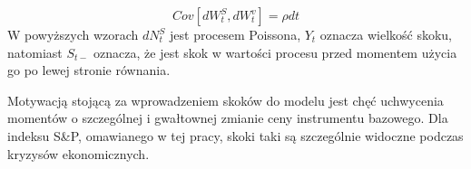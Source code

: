 \documentclass{pracamgr}
\begin{document}
\begin{equation}
Cov[dW^S_t, dW^v_t] = \rho dt 
\end{equation}
W powyższych wzorach $dN_t^S$ jest procesem Poissona, $Y_t$ oznacza wielkość skoku, natomiast $S_{t-}$ oznacza, że jest skok w wartości procesu przed momentem użycia go po lewej stronie równania.

Motywacją stojącą za wprowadzeniem skoków do modelu jest chęć uchwycenia momentów o 
szczególnej i gwałtownej zmianie ceny instrumentu bazowego. Dla indeksu S\&P, omawianego w tej pracy,
skoki taki są szczególnie widoczne podczas kryzysów ekonomicznych. 










\end{document}
